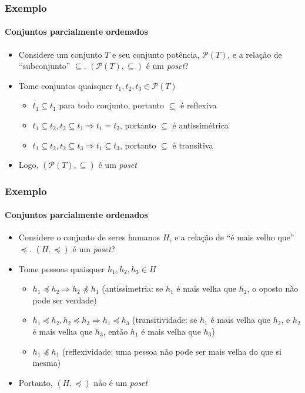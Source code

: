 \documentclass[12pt]{beamer}
\begin{document}
\begin{frame}
  \frametitle{Exemplo}
  \framesubtitle{Conjuntos parcialmente ordenados}
  \begin{itemize}
    \item Considere um conjunto $T$ e seu conjunto potência, $\mathcal{P}(T)$,
        e a relação de ``subconjunto'' $\subseteq$. $(\mathcal{P}(T),
          \subseteq)$ é um \emph{poset}?
    \item Tome conjuntos quaisquer $t_1, t_2, t_3 \in \mathcal{P}(T)$
    \begin{itemize}[itemsep=0pt]
      \item $t_1 \subseteq t_1$ para todo conjunto, portanto $\subseteq$ é
          reflexiva
      \item $t_1 \subseteq t_2, t_2 \subseteq t_1 \Rightarrow t_1 = t_2$,
          portanto $\subseteq$ é antissimétrica
      \item $t_1 \subseteq t_2, t_2 \subseteq t_3 \Rightarrow t_1 \subseteq
          t_3$, portanto $\subseteq$ é transitiva
    \end{itemize}
    \item Logo, $(\mathcal{P}(T), \subseteq)$ é um \emph{poset}
  \end{itemize}
\end{frame}

\begin{frame}
  \frametitle{Exemplo}
  \framesubtitle{Conjuntos parcialmente ordenados}
  \begin{itemize}
    \item Considere o conjunto de seres humanos $H$, e a relação de ``é mais
        velho que'' $\preccurlyeq$. $(H, \preccurlyeq)$ é um \emph{poset}?
    \item Tome pessoas quaisquer $h_1, h_2, h_3 \in H$
    \begin{itemize}[itemsep=0pt]
      \item $h_1 \preccurlyeq h_2 \Rightarrow h_2 \not\preccurlyeq h_1$
          (antissimetria: se $h_1$ é mais velha que $h_2$, o oposto não pode
            ser verdade)
      \item $h_1 \preccurlyeq h_2, h_2 \preccurlyeq h_3 \Rightarrow h_1
          \preccurlyeq h_3$ (transitividade: se $h_1$ é mais velha que $h_2$, e
            $h_2$ é mais velha que $h_3$, então $h_1$ é mais velha que $h_3$)
      \item $h_1 \not\preccurlyeq h_1$ (reflexividade: uma pessoa não pode ser
          mais velha do que si mesma)
    \end{itemize}
    \item Portanto, $(H, \preccurlyeq)$ não é um \emph{poset}
  \end{itemize}
\end{frame}
\end{document}
